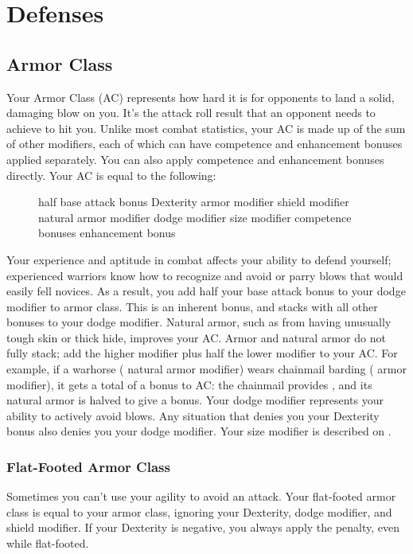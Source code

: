 \section{Defenses}

\subsection{Armor Class}
Your Armor Class (AC) represents how hard it is for opponents to land a solid, damaging blow on you. It's the attack roll result that an opponent needs to achieve to hit you. Unlike most combat statistics, your AC is made up of the sum of other modifiers, each of which can have competence and enhancement bonuses applied separately. You can also apply competence and enhancement bonuses directly. Your AC is equal to the following:

\begin{figure}[h]
     \add half base attack bonus \add Dexterity \add armor modifier \add shield modifier \add natural armor modifier \add dodge modifier \add size modifier \add competence bonuses \add enhancement bonus
\end{figure}

 Your experience and aptitude in combat affects your ability to defend yourself; experienced warriors know how to recognize and avoid or parry blows that would easily fell novices. As a result, you add half your base attack bonus to your dodge modifier to armor class. This is an inherent bonus, and stacks with all other bonuses to your dodge modifier.
 Natural armor, such as from having unusually tough skin or thick hide, improves your AC. Armor and natural armor do not fully stack; add the higher modifier plus half the lower modifier to your AC. For example, if a warhorse ( natural armor modifier) wears chainmail barding ( armor modifier), it gets a total of a  bonus to AC: the chainmail provides , and its natural armor is halved to give a  bonus.
 Your dodge modifier represents your ability to actively avoid blows. Any situation that denies you your Dexterity bonus also denies you your dodge modifier.
 Your size modifier is described on .

\subsubsection{Flat-Footed Armor Class}
Sometimes you can't use your agility to avoid an attack. Your flat-footed armor class is equal to your armor class, ignoring your Dexterity, dodge modifier, and shield modifier. If your Dexterity is negative, you always apply the penalty, even while flat-footed.

